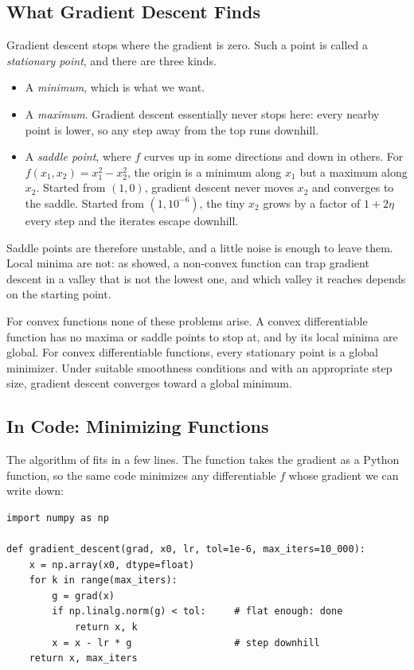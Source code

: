 \subsection{What Gradient Descent Finds}
\label{sec:ch02-gd-finds}

Gradient descent stops where the gradient is zero. Such a point is called
a \emph{stationary point}, and there are three kinds.
\begin{itemize}
  \item A \emph{minimum}, which is what we want.
  \item A \emph{maximum}. Gradient descent essentially never stops here:
    every nearby point is lower, so any step away from the top runs
    downhill.
  \item A \emph{saddle point}, where $f$ curves up in some directions and
    down in others. For $f(x_1, x_2) = x_1^2 - x_2^2$, the origin is
    a minimum along $x_1$ but a maximum along $x_2$. Started from $(1, 0)$,
    gradient descent never moves $x_2$ and converges to the saddle.
    Started from $(1, 10^{-6})$, the tiny $x_2$ grows by a factor of
    $1 + 2\eta$ every step and the iterates escape downhill.
\end{itemize}
Saddle points are therefore unstable, and a little noise is enough to leave
them. Local minima are not: as  showed, a
non-convex function can trap gradient descent in a valley that is not the
lowest one, and which valley it reaches depends on the starting point.

For convex functions none of these problems arise. A convex
differentiable function has no maxima or saddle points to stop at, and by
 its local minima are global. For convex 
differentiable functions, every stationary point is a global minimizer. 
Under suitable smoothness conditions and with an appropriate step size, 
gradient descent converges toward a global minimum.

\subsection{In Code: Minimizing Functions}
\label{sec:ch02-gd-code}

The algorithm of  fits in a few lines. The
function takes the gradient as a Python function, so the same code
minimizes any differentiable $f$ whose gradient we can write down:

\begin{lstlisting}
import numpy as np

def gradient_descent(grad, x0, lr, tol=1e-6, max_iters=10_000):
    x = np.array(x0, dtype=float)
    for k in range(max_iters):
        g = grad(x)
        if np.linalg.norm(g) < tol:     # flat enough: done
            return x, k
        x = x - lr * g                  # step downhill
    return x, max_iters
\end{lstlisting}

